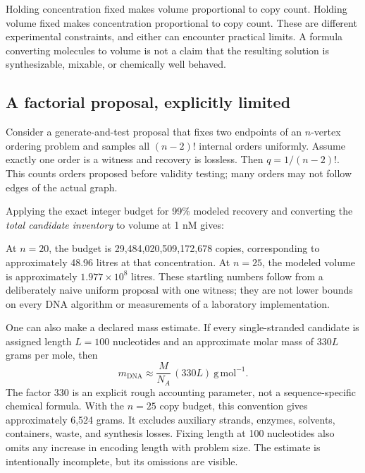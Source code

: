 Holding concentration fixed makes volume proportional to copy count. Holding volume fixed makes concentration proportional to copy count. These are different experimental constraints, and either can encounter practical limits. A formula converting molecules to volume is not a claim that the resulting solution is synthesizable, mixable, or chemically well behaved.

\subsection{A factorial proposal, explicitly limited}

Consider a generate-and-test proposal that fixes two endpoints of an $n$-vertex ordering problem and samples all $(n-2)!$ internal orders uniformly. Assume exactly one order is a witness and recovery is lossless. Then $q=1/(n-2)!$. This counts orders proposed before validity testing; many orders may not follow edges of the actual graph.

Applying the exact integer budget for 99\% modeled recovery and converting the \emph{total candidate inventory} to volume at 1 nM gives:

\begin{center}\small\end{center}

At $n=20$, the budget is 29,484,020,509,172,678 copies, corresponding to approximately 48.96 litres at that concentration. At $n=25$, the modeled volume is approximately $1.977\times10^8$ litres. These startling numbers follow from a deliberately naive uniform proposal with one witness; they are not lower bounds on every DNA algorithm or measurements of a laboratory implementation.

One can also make a declared mass estimate. If every single-stranded candidate is assigned length $L=100$ nucleotides and an approximate molar mass of $330L$ grams per mole, then
\begin{equation}
m_{\mathrm{DNA}}\approx \frac{M}{N_A}\,(330L)\ \mathrm{g\,mol^{-1}}.
\label{eq:mass}
\end{equation}
The factor 330 is an explicit rough accounting parameter, not a sequence-specific chemical formula. With the $n=25$ copy budget, this convention gives approximately 6,524 grams. It excludes auxiliary strands, enzymes, solvents, containers, waste, and synthesis losses. Fixing length at 100 nucleotides also omits any increase in encoding length with problem size. The estimate is intentionally incomplete, but its omissions are visible.

